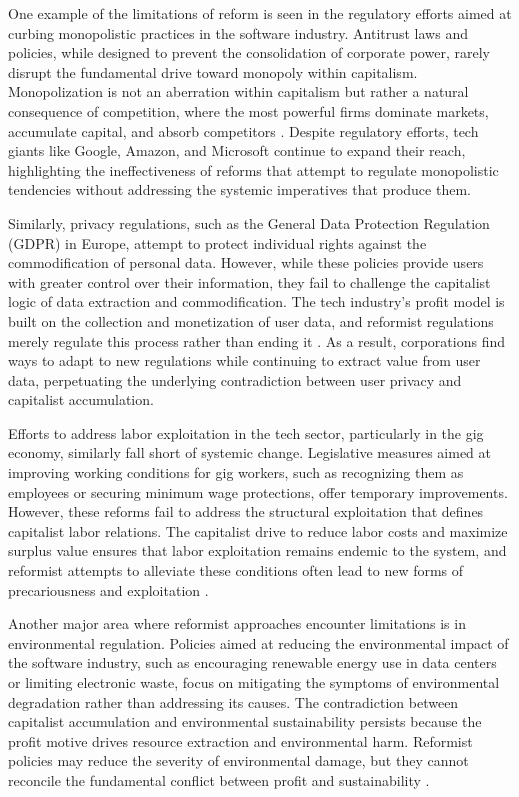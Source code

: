 One example of the limitations of reform is seen in the regulatory efforts aimed at curbing monopolistic practices in the software industry. Antitrust laws and policies, while designed to prevent the consolidation of corporate power, rarely disrupt the fundamental drive toward monopoly within capitalism. Monopolization is not an aberration within capitalism but rather a natural consequence of competition, where the most powerful firms dominate markets, accumulate capital, and absorb competitors \cite[pp.~45-47]{fuchs2015}. Despite regulatory efforts, tech giants like Google, Amazon, and Microsoft continue to expand their reach, highlighting the ineffectiveness of reforms that attempt to regulate monopolistic tendencies without addressing the systemic imperatives that produce them.

Similarly, privacy regulations, such as the General Data Protection Regulation (GDPR) in Europe, attempt to protect individual rights against the commodification of personal data. However, while these policies provide users with greater control over their information, they fail to challenge the capitalist logic of data extraction and commodification. The tech industry’s profit model is built on the collection and monetization of user data, and reformist regulations merely regulate this process rather than ending it \cite[pp.~111-113]{zuboff2020}. As a result, corporations find ways to adapt to new regulations while continuing to extract value from user data, perpetuating the underlying contradiction between user privacy and capitalist accumulation.

Efforts to address labor exploitation in the tech sector, particularly in the gig economy, similarly fall short of systemic change. Legislative measures aimed at improving working conditions for gig workers, such as recognizing them as employees or securing minimum wage protections, offer temporary improvements. However, these reforms fail to address the structural exploitation that defines capitalist labor relations. The capitalist drive to reduce labor costs and maximize surplus value ensures that labor exploitation remains endemic to the system, and reformist attempts to alleviate these conditions often lead to new forms of precariousness and exploitation \cite[pp.~145-148]{scholz2017}.

Another major area where reformist approaches encounter limitations is in environmental regulation. Policies aimed at reducing the environmental impact of the software industry, such as encouraging renewable energy use in data centers or limiting electronic waste, focus on mitigating the symptoms of environmental degradation rather than addressing its causes. The contradiction between capitalist accumulation and environmental sustainability persists because the profit motive drives resource extraction and environmental harm. Reformist policies may reduce the severity of environmental damage, but they cannot reconcile the fundamental conflict between profit and sustainability \cite[pp.~203-205]{maxwell2012}.

